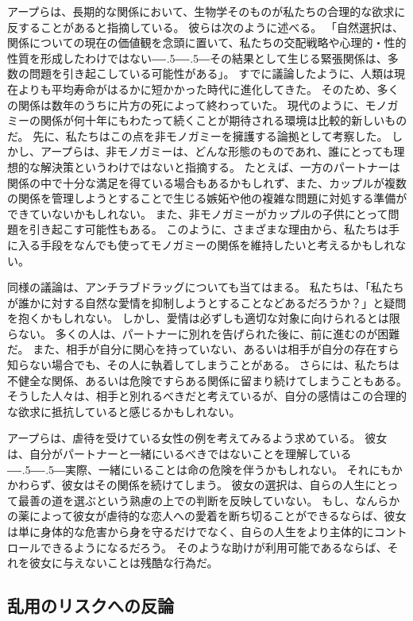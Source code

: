 \documentclass[paper=a4,book,openany]{jlreq}
\def\DDASH{―\kern-.5\zw―\kern-.5\zw―} %
\begin{document}
アープらは、長期的な関係において、生物学そのものが私たちの合理的な欲求に反することがあると指摘している。
彼らは次のように述べる。
「自然選択は、関係についての現在の価値観を念頭に置いて、私たちの交配戦略や心理的・性的性質を形成したわけではない{\DDASH}その結果として生じる緊張関係は、多数の問題を引き起こしている可能性がある」\citep[p.567]{earp12:_natur_selec_child_ethic_marriag_divor}。
すでに議論したように、人類は現在よりも平均寿命がはるかに短かかった時代に進化してきた。
そのため、多くの関係は数年のうちに片方の死によって終わっていた。
現代のように、モノガミーの関係が何十年にもわたって続くことが期待される環境は比較的新しいものだ。
先に、私たちはこの点を非モノガミーを擁護する論拠として考察した。
しかし、アープらは、非モノガミーは、どんな形態のものであれ、誰にとっても理想的な解決策というわけではないと指摘する。
たとえば、一方のパートナーは関係の中で十分な満足を得ている場合もあるかもしれず、また、カップルが複数の関係を管理しようとすることで生じる嫉妬や他の複雑な問題に対処する準備ができていないかもしれない。
また、非モノガミーがカップルの子供にとって問題を引き起こす可能性もある\citep[p.48]{earp20:_love_drugs}。
このように、さまざまな理由から、私たちは手に入る手段をなんでも使ってモノガミーの関係を維持したいと考えるかもしれない。

同様の議論は、アンチラブドラッグについても当てはまる。
私たちは、「私たちが誰かに対する自然な愛情を抑制しようとすることなどあるだろうか？」と疑問を抱くかもしれない。
しかし、愛情は必ずしも適切な対象に向けられるとは限らない。
多くの人は、パートナーに別れを告げられた後に、前に進むのが困難だ。
また、相手が自分に関心を持っていない、あるいは相手が自分の存在すら知らない場合でも、その人に執着してしまうことがある。
さらには、私たちは不健全な関係、あるいは危険ですらある関係に留まり続けてしまうこともある。
そうした人々は、相手と別れるべきだと考えているが、自分の感情はこの合理的な欲求に抵抗していると感じるかもしれない。

アープらは、虐待を受けている女性の例を考えてみるよう求めている。
彼女は、自分がパートナーと一緒にいるべきではないことを理解している{\DDASH}実際、一緒にいることは命の危険を伴うかもしれない。
それにもかかわらず、彼女はその関係を続けてしまう。
彼女の選択は、自らの人生にとって最善の道を選ぶという熟慮の上での判断を反映していない。
もし、なんらかの薬によって彼女が虐待的な恋人への愛着を断ち切ることができるならば、彼女は単に身体的な危害から身を守るだけでなく、自らの人生をより主体的にコントロールできるようになるだろう。
そのような助けが利用可能であるならば、それを彼女に与えないことは残酷な行為だ。

\subsection{乱用のリスクへの反論}
\end{document}
